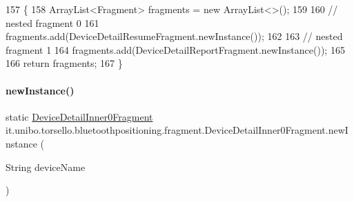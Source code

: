 \begin{DoxyCode}
157                                                \{
158         ArrayList<Fragment> fragments = \textcolor{keyword}{new} ArrayList<>();
159 
160         \textcolor{comment}{// nested fragment 0}
161         fragments.add(DeviceDetailResumeFragment.newInstance());
162 
163         \textcolor{comment}{// nested fragment 1}
164         fragments.add(DeviceDetailReportFragment.newInstance());
165 
166         \textcolor{keywordflow}{return} fragments;
167     \}
\end{DoxyCode}
\hypertarget{classit_1_1unibo_1_1torsello_1_1bluetoothpositioning_1_1fragment_1_1DeviceDetailInner0Fragment_a56724b3b2fecf5bbaa0832aed0b2e318_a56724b3b2fecf5bbaa0832aed0b2e318}{}\label{classit_1_1unibo_1_1torsello_1_1bluetoothpositioning_1_1fragment_1_1DeviceDetailInner0Fragment_a56724b3b2fecf5bbaa0832aed0b2e318_a56724b3b2fecf5bbaa0832aed0b2e318} 
\paragraph{\texorpdfstring{new\+Instance()}{newInstance()}}
{\footnotesize\ttfamily static \hyperlink{classit_1_1unibo_1_1torsello_1_1bluetoothpositioning_1_1fragment_1_1DeviceDetailInner0Fragment}{Device\+Detail\+Inner0\+Fragment} it.\+unibo.\+torsello.\+bluetoothpositioning.\+fragment.\+Device\+Detail\+Inner0\+Fragment.\+new\+Instance (\begin{DoxyParamCaption}\item[{String}]{device\+Name }\end{DoxyParamCaption})\hspace{0.3cm}{\ttfamily [static]}}


